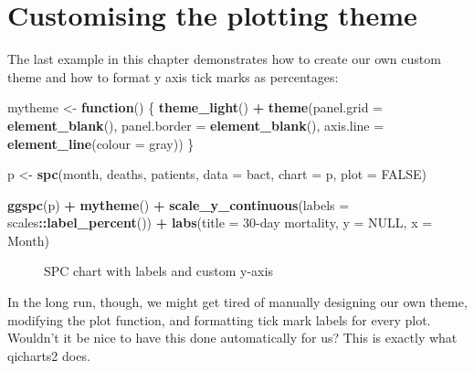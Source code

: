 \documentclass[
]{book}
\makeatletter
\newenvironment{Shaded}{\begin{snugshade}}{\end{snugshade}}
\newcommand{\AttributeTok}[1]{\textcolor[rgb]{0.13,0.29,0.53}{#1}}
\newcommand{\ConstantTok}[1]{\textcolor[rgb]{0.56,0.35,0.01}{#1}}
\newcommand{\ControlFlowTok}[1]{\textcolor[rgb]{0.13,0.29,0.53}{\textbf{#1}}}
\newcommand{\FunctionTok}[1]{\textcolor[rgb]{0.13,0.29,0.53}{\textbf{#1}}}
\newcommand{\NormalTok}[1]{#1}
\newcommand{\OtherTok}[1]{\textcolor[rgb]{0.56,0.35,0.01}{#1}}
\newcommand{\SpecialCharTok}[1]{\textcolor[rgb]{0.81,0.36,0.00}{\textbf{#1}}}
\newcommand{\StringTok}[1]{\textcolor[rgb]{0.31,0.60,0.02}{#1}}
\newcommand*\pandocbounded[1]{%
  \sbox\pandoc@box{#1}%
  \Gscale@div\@tempa{\textheight}{\dimexpr\ht\pandoc@box+\dp\pandoc@box\relax}%
  \Gscale@div\@tempb{\linewidth}{\wd\pandoc@box}%
  \ifdim\@tempb\p@<\@tempa\p@\let\@tempa\@tempb\fi%
  \ifdim\@tempa\p@<\p@\scalebox{\@tempa}{\usebox\pandoc@box}%
  \else\usebox{\pandoc@box}%
  \fi%
}
\makeatother
\begin{document}
\section{Customising the plotting theme}\label{customising-the-plotting-theme}

The last example in this chapter demonstrates how to create our own custom theme and how to format y axis tick marks as percentages:

\begin{Shaded}
\begin{Highlighting}[]
\NormalTok{mytheme }\OtherTok{\textless{}{-}} \ControlFlowTok{function}\NormalTok{() \{}
  \FunctionTok{theme\_light}\NormalTok{() }\SpecialCharTok{+}
  \FunctionTok{theme}\NormalTok{(}\AttributeTok{panel.grid   =} \FunctionTok{element\_blank}\NormalTok{(),}
        \AttributeTok{panel.border =} \FunctionTok{element\_blank}\NormalTok{(),}
        \AttributeTok{axis.line    =} \FunctionTok{element\_line}\NormalTok{(}\AttributeTok{colour =} \StringTok{\textquotesingle{}gray\textquotesingle{}}\NormalTok{))}
\NormalTok{\}}

\NormalTok{p }\OtherTok{\textless{}{-}} \FunctionTok{spc}\NormalTok{(month, deaths, patients,}
          \AttributeTok{data =}\NormalTok{ bact,}
          \AttributeTok{chart =} \StringTok{\textquotesingle{}p\textquotesingle{}}\NormalTok{,}
          \AttributeTok{plot =} \ConstantTok{FALSE}\NormalTok{)}

\FunctionTok{ggspc}\NormalTok{(p) }\SpecialCharTok{+}
  \FunctionTok{mytheme}\NormalTok{() }\SpecialCharTok{+}
  \FunctionTok{scale\_y\_continuous}\NormalTok{(}\AttributeTok{labels =}\NormalTok{ scales}\SpecialCharTok{::}\FunctionTok{label\_percent}\NormalTok{()) }\SpecialCharTok{+}
  \FunctionTok{labs}\NormalTok{(}\AttributeTok{title =} \StringTok{\textquotesingle{}30{-}day mortality\textquotesingle{}}\NormalTok{,}
       \AttributeTok{y     =} \ConstantTok{NULL}\NormalTok{,}
       \AttributeTok{x     =} \StringTok{\textquotesingle{}Month\textquotesingle{}}\NormalTok{)}
\end{Highlighting}
\end{Shaded}

\begin{figure}
\centering
\pandocbounded{}
\caption{\label{fig:ggplot-fig4}SPC chart with labels and custom y-axis}
\end{figure}

In the long run, though, we might get tired of manually designing our own theme, modifying the plot function, and formatting tick mark labels for every plot. Wouldn't it be nice to have this done automatically for us? This is exactly what qicharts2 does.
\end{document}
